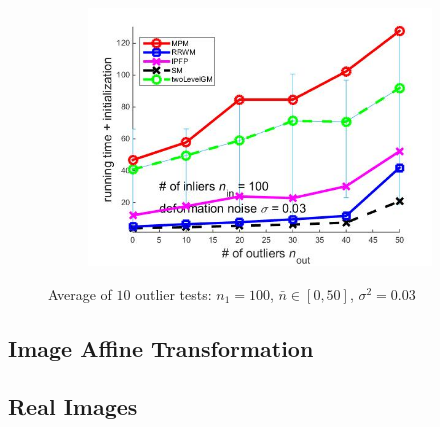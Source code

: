 \documentclass[
	fontsize=12pt,
	paper=a4,
	twoside=false,
	numbers=noenddot,
	plainheadsepline,
	toc=listof,
	toc=bibliography
]{scrartcl}
\begin{document}
\begin{figure}[h]
\begin{subfigure}[b]{0.3\textwidth}
		\includegraphics[scale=0.25]{"fig_ver2608/syntheticPointSets/ver4.3.1/outliertest_n50/time_summary_avg10t"} 
	\end{subfigure} 	
	\caption{Average of $10$ outlier tests: $n_1=100$, $\bar{n}\in[0,50]$, $\sigma^2=0.03$}
	\label{fig:test3_ver431}
\end{figure}

\FloatBarrier


\subsection{Image Affine Transformation}


\subsection{Real Images}


	
\end{document}
